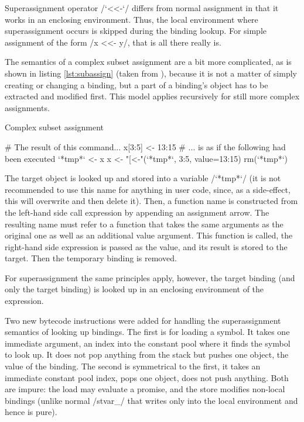 Superassignment operator \rinline/`<<-`/ differs from normal assignment in that it works in an enclosing environment. Thus, the local environment where superassignment occurs is skipped during the binding lookup. For simple assignment of the form \rinline/x <<- y/, that is all there really is.

The semantics of a complex subset assignment are a bit more complicated, as is shown in listing \ref{lst:subassign} (taken from \autocite{subset}), because it is not a matter of simply creating or changing a binding, but a part of a binding's object has to be extracted and modified first. This model applies recursively for still more complex assignments.

\begin{listing}[htbp]
  \caption{\label{lst:subassign}Complex subset assignment}
  \begin{rcode}
# The result of this command...
x[3:5] <- 13:15
# ... is as if the following had been executed
`*tmp*` <- x
x <- "[<-"(`*tmp*`, 3:5, value=13:15)
rm(`*tmp*`)
  \end{rcode}
\end{listing}

The target object is looked up and stored into a variable \rinline/`*tmp*`/ (it is not recommended to use this name for anything in user code, since, as a side-effect, this will overwrite and then delete it). Then, a function name is constructed from the left-hand side call expression by appending an assignment arrow. The resulting name must refer to a function that takes the same arguments as the original one as well as an additional value argument. This function is called, the right-hand side expression is passed as the value, and its result is stored to the target. Then the temporary binding is removed.

For superassignment the same principles apply, however, the target binding (and only the target binding) is looked up in an enclosing environment of the expression.

Two new bytecode instructions were added for handling the superassignment semantics of looking up bindings. The first is for loading a symbol. It takes one immediate argument, an index into the constant pool where it finds the symbol to look up. It does not pop anything from the stack but pushes one object, the value of the binding. The second is symmetrical to the first, it takes an immediate constant pool index, pops one object, does not push anything. Both are impure: the load may evaluate a promise, and the store modifies non-local bindings (unlike normal \cinline/stvar_/ that writes only into the local environment and hence is pure).

